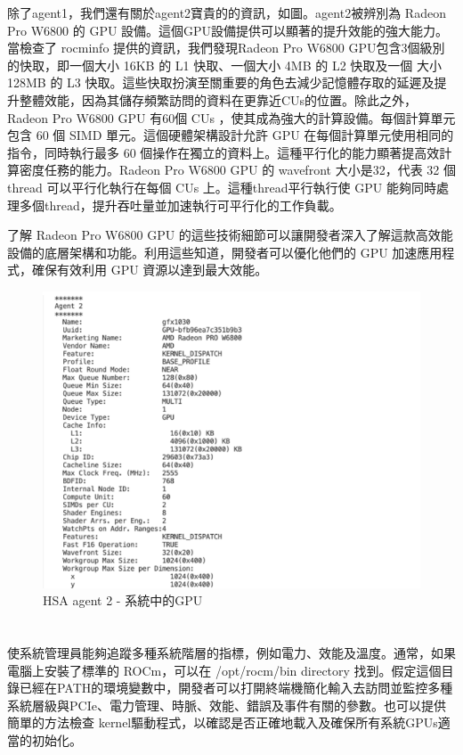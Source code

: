 除了agent1，我們還有關於agent2寶貴的的資訊，如圖。agent2被辨別為 Radeon Pro W6800 的 GPU 設備。這個GPU設備提供可以顯著的提升效能的強大能力。當檢查了 rocminfo 提供的資訊，我們發現Radeon Pro W6800 GPU包含3個級別的快取，即一個大小 16KB 的 L1 快取、一個大小 4MB 的 L2 快取及一個 大小 128MB 的 L3 快取。這些快取扮演至關重要的角色去減少記憶體存取的延遲及提升整體效能，因為其儲存頻繁訪問的資料在更靠近CUs的位置。除此之外，Radeon Pro W6800 GPU 有60個 CUs ，使其成為強大的計算設備。每個計算單元包含 60 個 SIMD 單元。這個硬體架構設計允許 GPU 在每個計算單元使用相同的指令，同時執行最多 60 個操作在獨立的資料上。這種平行化的能力顯著提高效計算密度任務的能力。Radeon Pro W6800 GPU 的 wavefront 大小是32，代表 32 個 thread 可以平行化執行在每個 CUs 上。這種thread平行執行使 GPU 能夠同時處理多個thread，提升吞吐量並加速執行可平行化的工作負載。

了解 Radeon Pro W6800 GPU 的這些技術細節可以讓開發者深入了解這款高效能設備的底層架構和功能。利用這些知道，開發者可以優化他們的 GPU 加速應用程式，確保有效利用 GPU 資源以達到最大效能。

\begin{figure}
    \centering
    \includegraphics[width=0.75\linewidth]{FileAusiliari/Screenshots/Figure7-3.png}
    \caption{HSA agent 2 - 系統中的GPU}
    \label{fig:HSA agent 2}
\end{figure}

\section{}

 使系統管理員能夠追蹤多種系統階層的指標，例如電力、效能及溫度。通常，如果電腦上安裝了標準的 ROCm，可以在 /opt/rocm/bin directory 找到。假定這個目錄已經在PATH的環境變數中，開發者可以打開終端機簡化輸入去訪問並監控多種系統層級與PCIe、電力管理、時脈、效能、錯誤及事件有關的參數。也可以提供簡單的方法檢查 kernel驅動程式，以確認是否正確地載入及確保所有系統GPUs適當的初始化。

